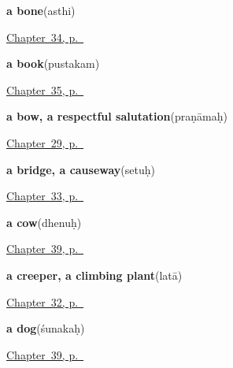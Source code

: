 \noindent\begin{minipage}[t]{\linewidth}
\raggedright
\textbf{a bone}\enspace\emph{}\enspace(asthi)\par
\footnotesize \hyperref[ch:sa-limbs]{Chapter~34, p.~\pageref*{ch:sa-limbs}}
\end{minipage}\par\smallskip

\noindent\begin{minipage}[t]{\linewidth}
\raggedright
\textbf{a book}\enspace\emph{}\enspace(pustakam)\par
\footnotesize \hyperref[ch:sa-house]{Chapter~35, p.~\pageref*{ch:sa-house}}
\end{minipage}\par\smallskip

\noindent\begin{minipage}[t]{\linewidth}
\raggedright
\textbf{a bow, a respectful salutation}\enspace\emph{}\enspace(praṇāmaḥ)\par
\footnotesize \hyperref[ch:sa-courtesy]{Chapter~29, p.~\pageref*{ch:sa-courtesy}}
\end{minipage}\par\smallskip

\noindent\begin{minipage}[t]{\linewidth}
\raggedright
\textbf{a bridge, a causeway}\enspace\emph{}\enspace(setuḥ)\par
\footnotesize \hyperref[ch:sa-land]{Chapter~33, p.~\pageref*{ch:sa-land}}
\end{minipage}\par\smallskip

\noindent\begin{minipage}[t]{\linewidth}
\raggedright
\textbf{a cow}\enspace\emph{}\enspace(dhenuḥ)\par
\footnotesize \hyperref[ch:sa-animals]{Chapter~39, p.~\pageref*{ch:sa-animals}}
\end{minipage}\par\smallskip

\noindent\begin{minipage}[t]{\linewidth}
\raggedright
\textbf{a creeper, a climbing plant}\enspace\emph{}\enspace(latā)\par
\footnotesize \hyperref[ch:sa-tree]{Chapter~32, p.~\pageref*{ch:sa-tree}}
\end{minipage}\par\smallskip

\noindent\begin{minipage}[t]{\linewidth}
\raggedright
\textbf{a dog}\enspace\emph{}\enspace(śunakaḥ)\par
\footnotesize \hyperref[ch:sa-animals]{Chapter~39, p.~\pageref*{ch:sa-animals}}
\end{minipage}\par\smallskip

